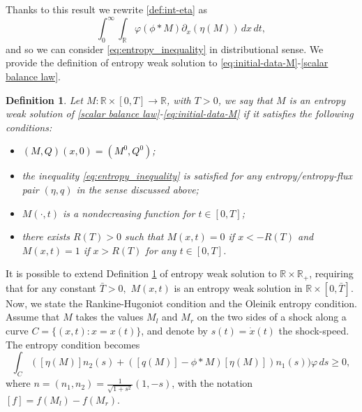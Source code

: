 \documentclass[11pt,a4paper,oneside]{amsart}
\newtheorem{definition}{Definition}[section]
\newcommand\R{\mathbb{R}}
\begin{document}
Thanks to this result we rewrite \eqref{def:int-eta} as
$$
\int_0^\infty\int_\R \varphi(\phi\ast M)\partial_x(\eta(M))\,dx\,dt,
$$
and so we can consider \eqref{eq:entropy_inequality} in distributional sense. We provide the definition of entropy weak solution to \eqref{eq:initial-data-M}-\eqref{scalar balance law}.
%
\begin{definition}\label{def:entropy_sol_M}
    Let $M:\R\times[0,T]\to\R$, with $T>0$, we say that $M$ is an entropy weak solution of \eqref{scalar balance law}-\eqref{eq:initial-data-M} 
    if it satisfies the following conditions:
    \begin{itemize}
        \item \textcolor{black}{$(M,Q)(x,0)=(M^0,Q^0)$;}
        \item the inequality \eqref{eq:entropy_inequality} is satisfied for any entropy/entropy-flux pair $(\eta,q)$ in the sense discussed above;
        \item $M(\cdot,t)$ is a nondecreasing function for $t\in[0,T]$;
        \item there exists $R(T)>0$ such that $M(x,t)=0$ if $x<-R(T)$ and $M(x,t)=1$ if $x>R(T)$ for any $t\in[0,T]$.
    \end{itemize}
\end{definition}
It is possible to extend Definition \ref{def:entropy_sol_M} of entropy weak solution to $\R\times\R_+$, 
requiring that for any constant $\bar T>0,$ $M(x,t)$ is an entropy weak solution in $\R\times[0,\bar T]$.
\newline
Now, we state the Rankine-Hugoniot condition and the Oleinik entropy condition. Assume that $M$ takes the values 
$M_l$ and $M_r$ on the two sides of a shock along a curve $C=\{(x,t):x=x(t)\}$, and denote by $s(t)=\dot x(t)$ the shock-speed. 
The entropy condition becomes
\begin{equation}\label{entropy_cond1}
\int_C ([\eta(M)]n_2(s)+([q(M)]-\phi\ast M)[\eta(M)])n_1(s))\varphi\,ds\geq0,
\end{equation}
where $n=(n_1,n_2)=\frac{1}{\sqrt{1+s^2}}(1,-s)$, with the notation $[f]=f(M_l)-f(M_r)$. 
\end{document}
